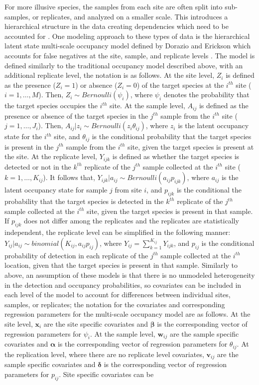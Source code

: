 \documentclass[12pt]{article}\usepackage[]{graphicx}\usepackage[]{color}
\begin{document}
For more illusive species, the samples from each site are often split into sub-samples, or replicates, and analyzed on a smaller scale. This introduces a hierarchical structure in the data creating dependencies which need to be accounted for \cite{MacKenzie}. One modeling approach to these types of data is the hierarchical latent state multi-scale occupancy model defined by Dorazio and Erickson which accounts for false negatives at the site, sample, and replicate levels \cite{Dorazio_Erickson}. The model is defined similarly to the traditional occupancy model described above, with an additional replicate level, the notation is as follows. At the site level, $Z_i$ is defined as the presence ($Z_i = 1$) or absence ($Z_i = 0$) of the target species at the $i^{th}$ site ($i = 1, \dots, M$). Then, $Z_i \sim Bernoulli(\psi_i)$, where $\psi_i$ denotes the probability that the target species occupies the $i^{th}$ site. At the sample level, $A_{ij}$ is defined as the presence or absence of the target species in the $j^{th}$ sample from the $i^{th}$ site ($j = 1, \dots, J_i$). Then, $A_{ij}|z_i \sim Bernoulli(z_i\theta_{ij})$, where $z_i$ is the latent occupancy state for the $i^{th}$ site, and $\theta_{ij}$ is the conditional probability that the target species is present in the $j^{th}$ sample from the $i^{th}$ site, given the target species is present at the site. At the replicate level, $Y_{ijk}$ is defined as whether the target species is detected or not in the $k^{th}$ replicate of the $j^{th}$ sample collected at the $i^{th}$ site ($k = 1, \dots, K_{ij}$). It follows that, $Y_{ijk}|a_{ij} \sim Bernoulli(a_{ij}p_{ijk})$, where $a_{ij}$ is the latent occupancy state for sample $j$ from site $i$, and $p_{ijk}$ is the conditional the probability that the target species is detected in the $k^{th}$ replicate of the $j^{th}$ sample collected at the $i^{th}$ site, given the target species is present in that sample. If $p_{ijk}$ does not differ among the replicates and the replicates are statistically independent, the replicate level can be simplified in the following manner: $Y_{ij}|a_{ij} \sim binomial(K_{ij}, a_{ij}p_{ij})$, where $Y_{ij} = \sum_{k = 1}^{K_{ij}}Y_{ijk}$, and $p_{ij}$ is the conditional probability of detection in each replicate of the $j^{th}$ sample collected at the $i^{th}$ location, given that the target species is present in that sample. Similarly to above, an assumption of these models is that there is no unmodeled heterogeneity in the detection and occupancy probabilities, so covariates can be included in each level of the model to account for differences between individual sites, samples, or replicates; the notation for the covariates and corresponding regression parameters for the multi-scale occupancy model are as follows. At the site level, $\bm{x}_i$ are the site specific covariates and $\bm{\beta}$ is the corresponding vector of regression parameters for $\psi_i$. At the sample level, $\bm{w}_{ij}$ are the sample specific covariates and $\bm{\alpha}$ is the corresponding vector of regression parameters for $\theta_{ij}$. At the replication level, where there are no replicate level covariates, $\bm{v}_{ij}$ are the sample specific covariates and $\bm{\delta}$ is the corresponding vector of regression parameters for $p_{ij}$. Site specific covariates can be 
\end{document}
